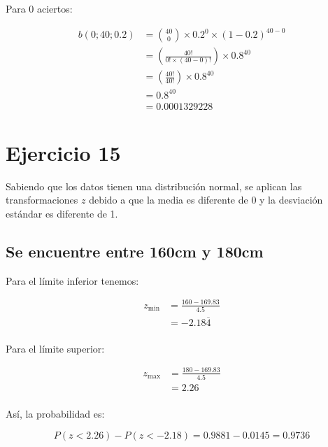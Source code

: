 \documentclass[letterpaper,12pt]{memoir}
\theoremstyle{definition}
\begin{document}
Para 0 aciertos:

\begin{equation*}
  \begin{split}
  b(0;40;0.2)&={40\choose 0} \times 0.2^{0} \times (1 - 0.2)^{40-0}\\
  &=(\frac{40!}{0!\times(40-0)!}) \times 0.8^{40}\\
  &=(\frac{40!}{40!}) \times 0.8^{40}\\
  &= 0.8^{40}\\
  &= 0.0001329228
  \end{split} 
\end{equation*}


\section*{Ejercicio 15}

Sabiendo que los datos tienen una distribución normal, se aplican las transformaciones $z$ debido a que la media es diferente de 0 y la desviación estándar es diferente de 1.

\subsection*{Se encuentre entre 160cm y 180cm}

Para el límite inferior tenemos:

\begin{equation*}
  \begin{split}
  z_{\text{min}} &= \frac{160 - 169.83}{4.5}\\
  &= -2.18\overline{4}\\
  \end{split}
\end{equation*}

Para el límite superior:

\begin{equation*}
  \begin{split}
  z_{\text{max}} &= \frac{180 - 169.83}{4.5}\\
  &= 2.26\\
  \end{split}
\end{equation*}

Así, la probabilidad es:


\begin{equation*}
  P(z < 2.26) - P(z < -2.18) = 0.9881-0.0145 = 0.9736
\end{equation*}
\end{document}
